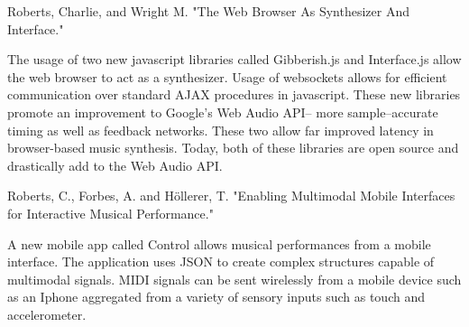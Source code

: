 Roberts, Charlie, and Wright M. "The Web Browser As Synthesizer And Interface."\cite{RobertsCharlieWright}

The usage of two new javascript libraries called Gibberish.js and Interface.js allow the web browser to act as a synthesizer. Usage of websockets allows for efficient communication over standard AJAX procedures in javascript. These new libraries promote an improvement to Google's Web Audio API-- more sample--accurate timing as well as feedback networks. These two allow far improved latency in browser-based music synthesis. Today, both of these libraries are open source and drastically add to the Web Audio API.

Roberts, C., Forbes, A. and Höllerer, T. "Enabling Multimodal Mobile Interfaces for Interactive Musical Performance."\cite{RobertsForbesHollerer}

A new mobile app called Control allows musical performances from a mobile interface. The application uses JSON to create complex structures capable of multimodal signals. MIDI signals can be sent wirelessly from a mobile device such as an Iphone aggregated from a variety of sensory inputs such as touch and accelerometer. 

